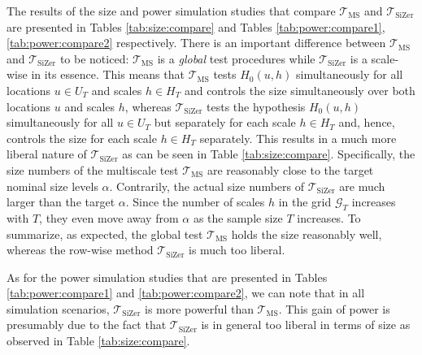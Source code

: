\documentclass[a4paper,12pt]{article}
\begin{document}
\begin{enumerate}[label=\arabic*.,leftmargin=0.6cm]
{\begin{itemize}[topsep=0pt]
The results of the size and power simulation studies that compare $\mathcal{T}_{\text{MS}}$ and $\mathcal{T}_{\text{SiZer}}$ are presented in Tables \ref{tab:size:compare} and Tables \ref{tab:power:compare1}, \ref{tab:power:compare2} respectively. There is an important difference between $\mathcal{T}_{\text{MS}}$ and $\mathcal{T}_{\text{SiZer}}$ to be noticed: $\mathcal{T}_{\text{MS}}$ is a \textit{global} test procedures while $\mathcal{T}_{\text{SiZer}}$ is a scale-wise in its essence. This means that $\mathcal{T}_{\text{MS}}$ tests $H_0(u,h)$ simultaneously for all locations $u \in U_T$ and scales $h \in H_T$ and controls the size simultaneously over both locations $u$ and scales $h$, whereas $\mathcal{T}_{\text{SiZer}}$ tests the hypothesis $H_0(u,h)$ simultaneously for all $u \in U_T$ but separately for each scale $h \in H_T$ and, hence, controls the size for each scale $h \in H_T$ separately. This results in a much more liberal nature of $\mathcal{T}_{\text{SiZer}}$ as can be seen in Table \ref{tab:size:compare}. Specifically, the size numbers of the multiscale test $\mathcal{T}_{\text{MS}}$ are reasonably close to the target nominal size levels $\alpha$. Contrarily, the actual size numbers of $\mathcal{T}_{\text{SiZer}}$ are much larger than the target $\alpha$. Since the number of scales $h$ in the grid $\mathcal{G}_T$ increases with $T$, they even move away from $\alpha$ as the sample size $T$ increases. To summarize, as expected, the global test $\mathcal{T}_{\text{MS}}$ holds the size reasonably well, whereas the row-wise method $\mathcal{T}_{\text{SiZer}}$ is much too liberal. 

As for the power simulation studies that are presented  in Tables \ref{tab:power:compare1} and \ref{tab:power:compare2}, we can note that in all simulation scenarios, $\mathcal{T}_{\text{SiZer}}$ is more powerful than $\mathcal{T}_{\text{MS}}$. This gain of power is presumably due to the fact that $\mathcal{T}_{\text{SiZer}}$ is in general too liberal in terms of size as observed in Table \ref{tab:size:compare}.



\end{itemize}}
\end{enumerate}
\end{document}

